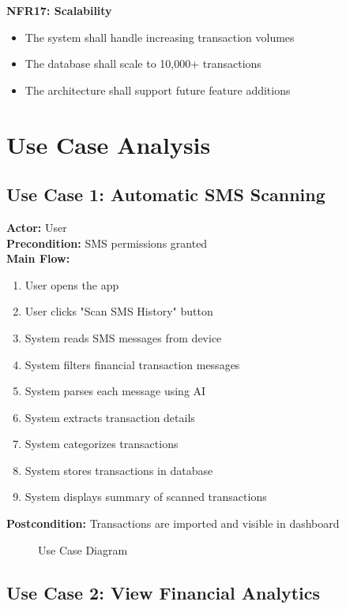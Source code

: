 \documentclass[11pt,a4paper]{report}
\begin{document}
\textbf{NFR17: Scalability}
\begin{itemize}
    \item The system shall handle increasing transaction volumes
    \item The database shall scale to 10,000+ transactions
    \item The architecture shall support future feature additions
\end{itemize}

\section{Use Case Analysis}

\subsection{Use Case 1: Automatic SMS Scanning}

\textbf{Actor:} User\\
\textbf{Precondition:} SMS permissions granted\\
\textbf{Main Flow:}
\begin{enumerate}
    \item User opens the app
    \item User clicks "Scan SMS History" button
    \item System reads SMS messages from device
    \item System filters financial transaction messages
    \item System parses each message using AI
    \item System extracts transaction details
    \item System categorizes transactions
    \item System stores transactions in database
    \item System displays summary of scanned transactions
\end{enumerate}
\textbf{Postcondition:} Transactions are imported and visible in dashboard

\begin{figure}[htbp]
    \centering
    \caption{Use Case Diagram}
    \label{fig:usecase}
\end{figure}

\subsection{Use Case 2: View Financial Analytics}
\end{document}
